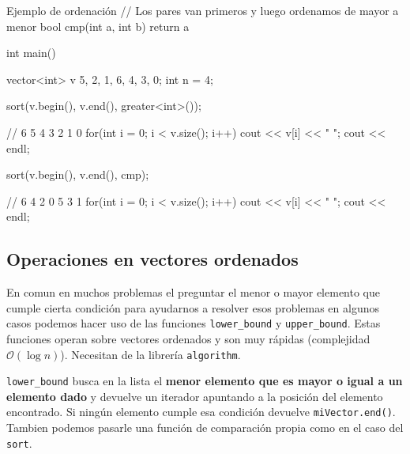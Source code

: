 \documentclass{article}
\begin{document}
    \begin{codelisting}{Ejemplo de ordenación}
// Los pares van primeros y luego ordenamos de mayor a menor
bool cmp(int a, int b) {
    return a %
}

int main() {
    vector<int> v {5, 2, 1, 6, 4, 3, 0};
    int n = 4;

    sort(v.begin(), v.end(), greater<int>());

    // 6 5 4 3 2 1 0
    for(int i = 0; i < v.size(); i++) cout << v[i] << " ";
    cout << endl;

    sort(v.begin(), v.end(), cmp);

    // 6 4 2 0 5 3 1
    for(int i = 0; i < v.size(); i++) cout << v[i] << " ";
    cout << endl;
}
    \end{codelisting}
    
    \subsection{Operaciones en vectores ordenados}
    En comun en muchos problemas el preguntar el menor o mayor elemento que cumple cierta condición para ayudarnos
    a resolver esos problemas en algunos casos podemos hacer uso de las funciones \texttt{lower\_bound} y 
    \texttt{upper\_bound}. Estas funciones operan sobre vectores ordenados y son muy rápidas (complejidad $\mathcal{O}(\log n)$). Necesitan
    de la librería \texttt{algorithm}.

    \texttt{lower\_bound} busca en la lista el \textbf{menor elemento que es mayor o igual a un elemento dado} y devuelve un iterador apuntando
    a la posición del elemento encontrado. Si ningún elemento cumple esa condición devuelve \texttt{miVector.end()}. Tambien podemos pasarle
    una función de comparación propia como en el caso del \texttt{sort}.
\end{document}
